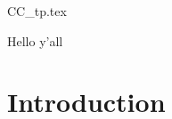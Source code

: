\documentclass[oneside, 12pt]{book}
\begin{document}
\frontmatter \pagestyle{empty}

{CC_tp.tex}

\begin{bookabstract}
Hello y'all
\end{bookabstract}

\centeredtoc

\mainmatter \pagestyle{mypage2} \normalfont

\chapter{Introduction}








\backmatter

\end{document}
